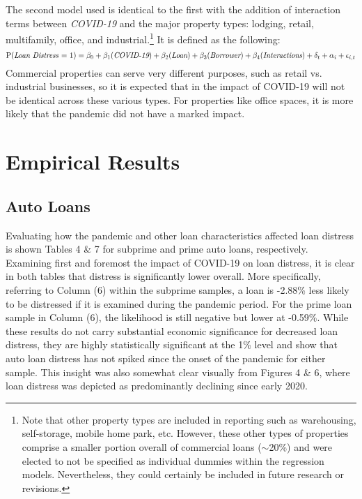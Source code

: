 \documentclass[10.5pt]{article}
\begin{document}
The second model used is identical to the first with the addition of interaction terms between \textit{COVID-19} and the major property types: lodging, retail, multifamily, office, and industrial.\footnote{Note that other property types are included in reporting such as warehousing, self-storage, mobile home park, etc. However, these other types of properties comprise a smaller portion overall of commercial loans ($\sim$20\%) and were elected to not be specified as individual dummies within the regression models. Nevertheless, they could certainly be included in future research or revisions.} It is defined as the following: 
\begin{equation}
    \text{P(\textit{Loan Distress} = 1)} = \beta_0 +
    \beta_1(\textit{COVID-19}) +
    \beta_2(\textit{Loan}) + \beta_3(\textit{Borrower}) + \beta_4(\textit{Interactions})
    + \delta_t + \alpha_i + \epsilon_{i,t}
\end{equation}
Commercial properties can serve very different purposes, such as retail vs. industrial businesses, so it is expected that in the impact of COVID-19 will not be identical across these various types. For properties like office spaces, it is more likely that the pandemic did not have a marked impact.

\section{Empirical Results} 

\subsection{Auto Loans}
Evaluating how the pandemic and other loan characteristics affected loan distress is shown Tables 4 \& 7 for subprime and prime auto loans, respectively. Examining first and foremost the impact of COVID-19 on loan distress, it is clear in both tables that distress is significantly lower overall. More specifically, referring to Column (6) within the subprime samples, a loan is -2.88\% less likely to be distressed if it is examined during the pandemic period. For the prime loan sample in Column (6), the likelihood is still negative but lower at -0.59\%. While these results do not carry substantial economic significance for decreased loan distress, they are highly statistically significant at the 1\% level and show that auto loan distress has not spiked since the onset of the pandemic for either sample. This insight was also somewhat clear visually from Figures 4 \& 6, where loan distress was depicted as predominantly declining since early 2020.  
\end{document}
